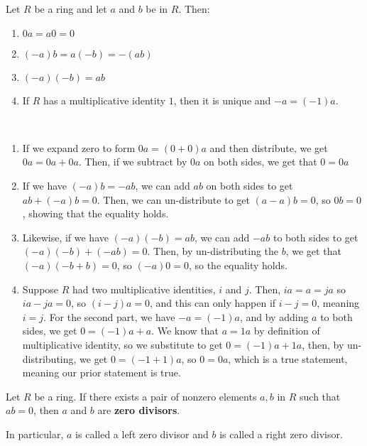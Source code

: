 \documentclass{article}
\begin{document}
\begin{proposition}
Let $R$ be a ring and let $a$ and $b$ be in $R$. Then:
\begin{enumerate}
    \item $0a = a0 = 0$
    \item $(-a)b = a(-b) = -(ab)$
    \item $(-a)(-b) = ab$
    \item If $R$ has a multiplicative identity $1$, then it is unique and $-a = (-1)a$. 
\end{enumerate}
\end{proposition}

\begin{customproof}
    \ 

\begin{enumerate}
    \item If we expand zero to form $0a = (0+0)a$ and then distribute, we get $0a = 0a + 0a$. Then, if we subtract by $0a$ on both sides, we get that $0 = 0a$
    \item If we have $(-a)b = -ab$, we can add $ab$ on both sides to get $ab + (-a)b = 0$. Then, we can un-distribute to get $(a-a)b = 0$, so $0b = 0$, showing that the equality holds. 
    \item Likewise, if we have $(-a)(-b) = ab$, we can add $-ab$ to both sides to get $(-a)(-b) + (-ab) = 0$. Then, by un-distributing the $b$, we get that $(-a)(-b+b) = 0$, so $(-a)0 = 0$, so the equality holds. 
    \item Suppose $R$ had two multiplicative identities, $i$ and $j$. Then, $ia = a = ja$ so $ia - ja = 0$, so $(i-j)a = 0$, and this can only happen if $i-j = 0$, meaning $i = j$. For the second part, we have $-a = (-1)a$, and by adding $a$ to both sides, we get $0 = (-1)a + a$. We know that $a = 1a$ by definition of multiplicative identity, so we substitute to get $0 = (-1)a + 1a$, then, by un-distributing, we get $0 = (-1+1)a$, so $0 = 0a$, which is a true statement, meaning our prior statement is true. 
\end{enumerate}
\end{customproof}

\begin{definition}
Let $R$ be a ring. If there exists a pair of nonzero elements $a,b$ in $R$ such that $ab = 0$, then $a$ and $b$ are \textbf{zero divisors}.

In particular, $a$ is called a left zero divisor and $b$ is called a right zero divisor. 
\end{definition}
\end{document}
